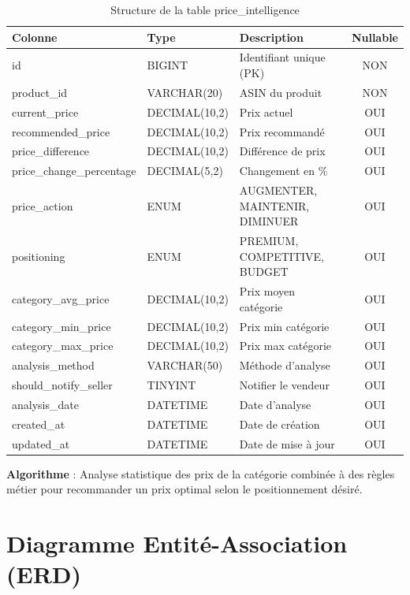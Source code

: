 \documentclass[12pt,a4paper]{report}
\begin{document}
\begin{table}[H]
    \centering
    \caption{Structure de la table price\_intelligence}
    \begin{tabularx}{\textwidth}{llXc}
        \toprule
        \textbf{Colonne} & \textbf{Type} & \textbf{Description} & \textbf{Nullable} \\
        \midrule
        id & BIGINT & Identifiant unique (PK) & NON \\
        product\_id & VARCHAR(20) & ASIN du produit & NON \\
        current\_price & DECIMAL(10,2) & Prix actuel & OUI \\
        recommended\_price & DECIMAL(10,2) & Prix recommandé & OUI \\
        price\_difference & DECIMAL(10,2) & Différence de prix & OUI \\
        price\_change\_percentage & DECIMAL(5,2) & Changement en \% & OUI \\
        price\_action & ENUM & AUGMENTER, MAINTENIR, DIMINUER & OUI \\
        positioning & ENUM & PREMIUM, COMPETITIVE, BUDGET & OUI \\
        category\_avg\_price & DECIMAL(10,2) & Prix moyen catégorie & OUI \\
        category\_min\_price & DECIMAL(10,2) & Prix min catégorie & OUI \\
        category\_max\_price & DECIMAL(10,2) & Prix max catégorie & OUI \\
        analysis\_method & VARCHAR(50) & Méthode d'analyse & OUI \\
        should\_notify\_seller & TINYINT & Notifier le vendeur & OUI \\
        analysis\_date & DATETIME & Date d'analyse & OUI \\
        created\_at & DATETIME & Date de création & OUI \\
        updated\_at & DATETIME & Date de mise à jour & OUI \\
        \bottomrule
    \end{tabularx}
    \label{tab:price_intelligence}
\end{table}

\textbf{Algorithme} : Analyse statistique des prix de la catégorie combinée à des règles métier pour recommander un prix optimal selon le positionnement désiré.

\section{Diagramme Entité-Association (ERD)}
\end{document}
